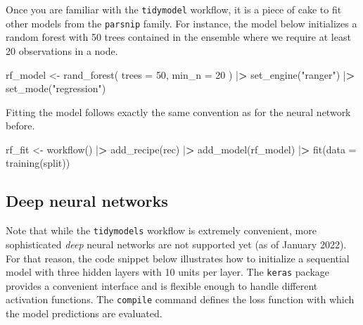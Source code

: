 \documentclass[
]{book}
\newenvironment{Shaded}{\begin{snugshade}}{\end{snugshade}}
\newcommand{\AttributeTok}[1]{\textcolor[rgb]{0.61,0.61,0.61}{#1}}
\newcommand{\DecValTok}[1]{\textcolor[rgb]{0.06,0.06,0.06}{#1}}
\newcommand{\ErrorTok}[1]{\textcolor[rgb]{0.14,0.14,0.14}{\textbf{#1}}}
\newcommand{\FunctionTok}[1]{\textcolor[rgb]{0,0,0}{#1}}
\newcommand{\NormalTok}[1]{#1}
\newcommand{\OtherTok}[1]{\textcolor[rgb]{0.37,0.37,0.37}{#1}}
\newcommand{\SpecialCharTok}[1]{\textcolor[rgb]{0,0,0}{#1}}
\newcommand{\StringTok}[1]{\textcolor[rgb]{0.5,0.5,0.5}{#1}}
\begin{document}
Once you are familiar with the \texttt{tidymodel} workflow, it is a piece of cake to fit other models from the \texttt{parsnip} family. For instance, the model below initializes a random forest with 50 trees contained in the ensemble where we require at least 20 observations in a node.

\begin{Shaded}
\begin{Highlighting}[]
\NormalTok{rf\_model }\OtherTok{\textless{}{-}} \FunctionTok{rand\_forest}\NormalTok{(}
  \AttributeTok{trees =} \DecValTok{50}\NormalTok{,}
  \AttributeTok{min\_n =} \DecValTok{20}
\NormalTok{) }\SpecialCharTok{|}\ErrorTok{\textgreater{}}
  \FunctionTok{set\_engine}\NormalTok{(}\StringTok{"ranger"}\NormalTok{) }\SpecialCharTok{|}\ErrorTok{\textgreater{}}
  \FunctionTok{set\_mode}\NormalTok{(}\StringTok{"regression"}\NormalTok{)}
\end{Highlighting}
\end{Shaded}

Fitting the model follows exactly the same convention as for the neural network before.

\begin{Shaded}
\begin{Highlighting}[]
\NormalTok{rf\_fit }\OtherTok{\textless{}{-}} \FunctionTok{workflow}\NormalTok{() }\SpecialCharTok{|}\ErrorTok{\textgreater{}}
  \FunctionTok{add\_recipe}\NormalTok{(rec) }\SpecialCharTok{|}\ErrorTok{\textgreater{}}
  \FunctionTok{add\_model}\NormalTok{(rf\_model) }\SpecialCharTok{|}\ErrorTok{\textgreater{}}
  \FunctionTok{fit}\NormalTok{(}\AttributeTok{data =} \FunctionTok{training}\NormalTok{(split))}
\end{Highlighting}
\end{Shaded}

\hypertarget{deep-neural-networks}{%
\subsection{Deep neural networks}\label{deep-neural-networks}}

Note that while the \texttt{tidymodels} workflow is extremely convenient, more sophisticated \emph{deep} neural networks are not supported yet (as of January 2022). For that reason, the code snippet below illustrates how to initialize a sequential model with three hidden layers with 10 units per layer. The \texttt{keras} package provides a convenient interface and is flexible enough to handle different activation functions. The \texttt{compile} command defines the loss function with which the model predictions are evaluated.
\end{document}

